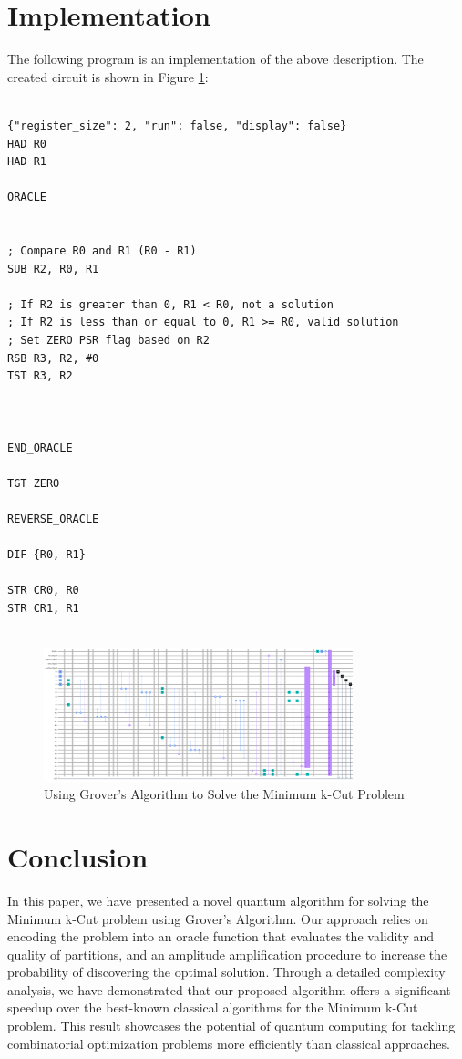 \section{Implementation}

The following program is an implementation of the above description. The created circuit is shown in Figure \ref{fig:Minimum_k-Cut}:

\begin{lstlisting}

{"register_size": 2, "run": false, "display": false}
HAD R0
HAD R1

ORACLE


; Compare R0 and R1 (R0 - R1)
SUB R2, R0, R1

; If R2 is greater than 0, R1 < R0, not a solution
; If R2 is less than or equal to 0, R1 >= R0, valid solution
; Set ZERO PSR flag based on R2
RSB R3, R2, #0
TST R3, R2



END_ORACLE

TGT ZERO

REVERSE_ORACLE

DIF {R0, R1}

STR CR0, R0
STR CR1, R1


\end{lstlisting}

\begin{figure}[htp]
    \centering
    \includegraphics[width=9cm]{Figures/Minimum_k-Cut_circuit.png}
    \caption{Using Grover's Algorithm to Solve the Minimum k-Cut Problem}
    \label{fig:Minimum_k-Cut}
\end{figure}

\section{Conclusion}\label{sec:conclusion}

In this paper, we have presented a novel quantum algorithm for solving the Minimum k-Cut problem using Grover's Algorithm. Our approach relies on encoding the problem into an oracle function that evaluates the validity and quality of partitions, and an amplitude amplification procedure to increase the probability of discovering the optimal solution. Through a detailed complexity analysis, we have demonstrated that our proposed algorithm offers a significant speedup over the best-known classical algorithms for the Minimum k-Cut problem. This result showcases the potential of quantum computing for tackling combinatorial optimization problems more efficiently than classical approaches.

